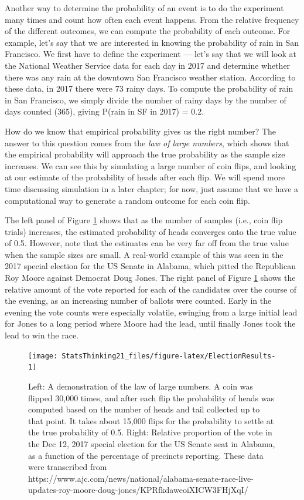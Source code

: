 \documentclass[12pt,]{book}
\theoremstyle{definition}
\theoremstyle{definition}
\theoremstyle{definition}
\theoremstyle{remark}
\begin{document}
Another way to determine the probability of an event is to do the experiment many times and count how often each event happens. From the relative frequency of the different outcomes, we can compute the probability of each outcome. For example, let's say that we are interested in knowing the probability of rain in San Francisco. We first have to define the experiment --- let's say that we will look at the National Weather Service data for each day in 2017 and determine whether there was any rain at the downtown San Francisco weather station. According to these data, in 2017 there were 73 rainy days. To compute the probability of rain in San Francisco, we simply divide the number of rainy days by the number of days counted (365), giving P(rain in SF in 2017) = 0.2.

How do we know that empirical probability gives us the right number? The answer to this question comes from the \emph{law of large numbers}, which shows that the empirical probability will approach the true probability as the sample size increases. We can see this by simulating a large number of coin flips, and looking at our estimate of the probability of heads after each flip. We will spend more time discussing simulation in a later chapter; for now, just assume that we have a computational way to generate a random outcome for each coin flip.

The left panel of Figure \ref{fig:ElectionResults} shows that as the number of samples (i.e., coin flip trials) increases, the estimated probability of heads converges onto the true value of 0.5. However, note that the estimates can be very far off from the true value when the sample sizes are small. A real-world example of this was seen in the 2017 special election for the US Senate in Alabama, which pitted the Republican Roy Moore against Democrat Doug Jones. The right panel of Figure \ref{fig:ElectionResults} shows the relative amount of the vote reported for each of the candidates over the course of the evening, as an increasing number of ballots were counted. Early in the evening the vote counts were especially volatile, swinging from a large initial lead for Jones to a long period where Moore had the lead, until finally Jones took the lead to win the race.

\begin{figure}
\texttt{[image: StatsThinking21\_files/figure-latex/ElectionResults-1]} \caption{Left: A demonstration of the law of large numbers.  A coin was flipped 30,000 times, and after each flip the probability of heads was computed based on the number of heads and tail collected up to that point.  It takes about 15,000 flips for the probability to settle at the true probability of 0.5. Right: Relative proportion of the vote in the Dec 12, 2017 special election for the US Senate seat in Alabama, as a function of the percentage of precincts reporting. These data were transcribed from https://www.ajc.com/news/national/alabama-senate-race-live-updates-roy-moore-doug-jones/KPRfkdaweoiXICW3FHjXqI/}\label{fig:ElectionResults}
\end{figure}
\end{document}
